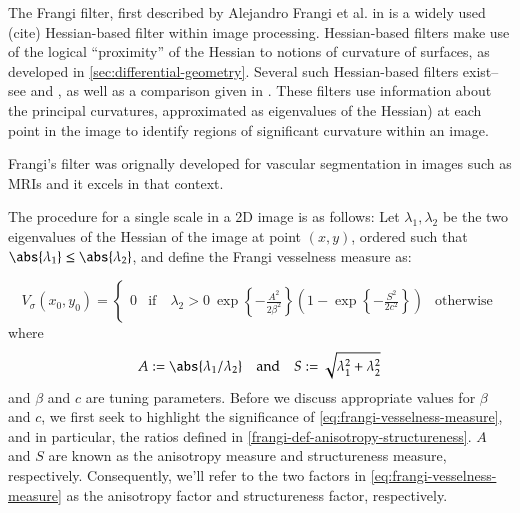     The Frangi filter, first described by Alejandro Frangi et al. in \cite{frangi-paper} is a widely used (cite) Hessian-based filter
    within image processing. Hessian-based filters make use of the
    logical ``proximity'' of the Hessian to notions of curvature of surfaces,
    as developed in \cref{sec:differential-geometry}. 
    Several such Hessian-based filters exist--see \cite{sato-filter} and \cite{lorenz-filter}, as well as a comparison given in \cite{olabarriaga-hessian-comparison}. These filters use information about the principal curvatures, approximated as eigenvalues of the Hessian) at each point in the image
    to identify regions of significant curvature within an image.
 
    
    Frangi's filter was orignally developed for vascular segmentation in images such as MRIs and it excels in that context.
    
    The procedure for a single scale in a 2D image is as follows:
    Let $\lambda_1, \lambda_2$ be the two eigenvalues of the Hessian of the image at point $(x, y)$,
    ordered such that $\abs{\lambda_1} \leq \abs{\lambda_2}$, and define the Frangi vesselness measure %
    as:
    
    \begin{equation} \label{eq:frangi-vesselness-measure}
    V_\sigma(x_0,y_0) = \begin{cases}
    0 & \text{if} \quad \lambda_2 > 0 \
    \exp\left\{-\frac{A^2}{2\beta^2}\right\}
    \left(1 - \exp\left\{-\frac{S^2}{2c^2}\right\}\right) & \text{otherwise}
    \end{cases} \end{equation}
    where
    \begin{equation} \label{frangi-def-anisotropy-structureness}
    A := \abs{\lambda_1 / \lambda_2}
    \quad \textrm{and} \quad 
    S := \sqrt{\lambda_1^2 + \lambda_2^2}
    \end{equation}
    and $\beta$ and $c$ are tuning parameters. Before we discuss appropriate values for $\beta$ and $c$, we first seek to highlight the significance of \cref{eq:frangi-vesselness-measure}, and in particular, the ratios defined in
    \cref{frangi-def-anisotropy-structureness}. $A$ and $S$ are known as the anisotropy measure and structureness measure, respectively. Consequently, we'll refer to the two factors in \cref{eq:frangi-vesselness-measure} as the anisotropy factor and structureness factor, respectively. 
    
